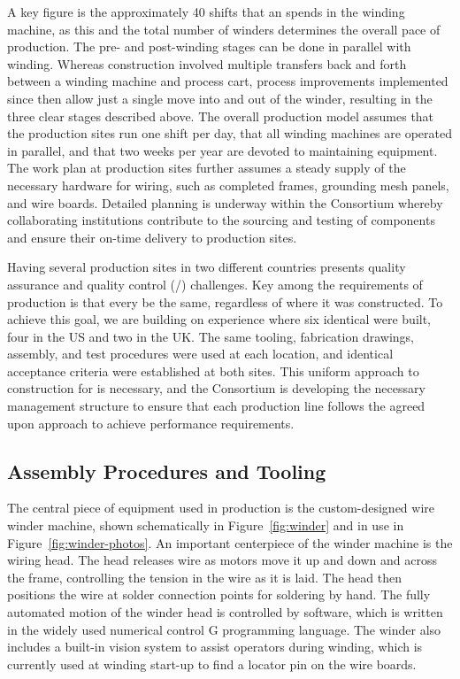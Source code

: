 A key figure is the approximately \num{40} shifts that an  spends in the winding machine, as this and the total number of winders determines the overall pace of production. The pre- and post-winding stages can be done in parallel with winding.  Whereas  construction involved multiple transfers back and forth between a winding machine and process cart, process improvements implemented since then allow just a single move into and out of the winder, resulting in the three clear stages described above.  The overall production model assumes that the  production sites run one shift per day, that all winding machines are operated in parallel, and that two weeks per year are devoted to maintaining equipment.  The work plan at production sites further assumes a steady supply of the necessary hardware for  wiring, such as completed frames, grounding mesh panels, and wire boards.  Detailed planning is underway within the   Consortium whereby collaborating institutions contribute to the sourcing and testing of components and ensure their on-time delivery to production sites.        

Having several  production sites in two different countries presents quality assurance and quality control (/) challenges. Key among the requirements of production is that every  be the same, regardless of where it was constructed. To achieve this goal, we are building on  experience where six identical  were built, four in the US and two in the UK. The same tooling, fabrication drawings, assembly, and test procedures were used at each location, and identical acceptance criteria were established at both sites.  This uniform approach to construction for  is necessary, and the  Consortium is developing the necessary management structure to ensure that each production line follows the agreed upon approach to achieve  performance requirements.


\subsection{Assembly Procedures and Tooling}
\label{sec:fdsp-apa-prod-tooling}


The central piece of equipment used in  production is the custom-designed wire winder machine, shown schematically in Figure~\ref{fig:winder} and in use in Figure~\ref{fig:winder-photos}.  An important centerpiece of the winder machine is the wiring head.  The head releases wire as motors move it up and down and across the frame, controlling the tension in the wire as it is laid.  The head then positions the wire at solder connection points for soldering by hand. The fully automated motion of the winder head is controlled by software, which is written in the widely used numerical control G programming language.  The winder also includes a built-in vision system to assist operators during winding, which is currently used at winding start-up to find a locator pin on the wire boards.  

